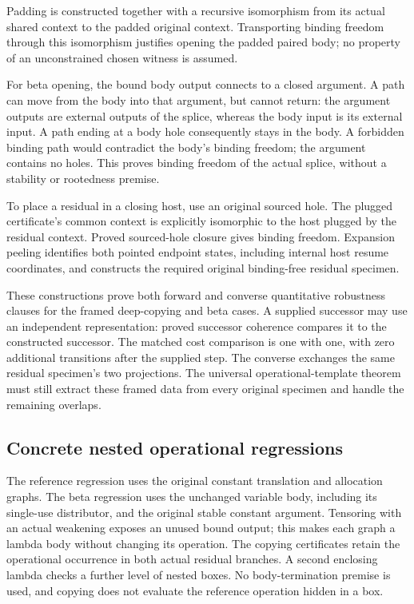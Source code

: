 Padding is constructed together with a recursive isomorphism from its
actual shared context to the padded original context. Transporting binding
freedom through this isomorphism justifies opening the padded paired body;
no property of an unconstrained chosen witness is assumed.

For beta opening, the bound body output connects to a closed argument.
A path can move from the body into that argument, but cannot return: the
argument outputs are external outputs of the splice, whereas the body
input is its external input. A path ending at a body hole consequently
stays in the body. A forbidden binding path would contradict the body's
binding freedom; the argument contains no holes. This proves binding
freedom of the actual splice, without a stability or rootedness premise.

To place a residual in a closing host, use an original sourced hole.
The plugged certificate's common context is explicitly isomorphic to the
host plugged by the residual context. Proved sourced-hole closure gives
binding freedom. Expansion peeling identifies both pointed endpoint
states, including internal host resume coordinates, and constructs the
required original binding-free residual specimen.

These constructions prove both forward and converse quantitative robustness
clauses for the framed deep-copying and beta cases. A supplied successor
may use an independent representation: proved successor coherence compares
it to the constructed successor. The matched cost comparison is one with
one, with zero additional transitions after the supplied step. The converse
exchanges the same residual specimen's two projections. The universal
operational-template theorem must still extract these framed data from
every original specimen and handle the remaining overlaps.

\subsection{Concrete nested operational regressions}
The reference regression uses the original constant translation and
allocation graphs. The beta regression uses the unchanged variable body,
including its single-use distributor, and the original stable constant
argument. Tensoring with an actual weakening exposes an unused bound output;
this makes each graph a lambda body without changing its operation.
The copying certificates retain the operational occurrence in both actual
residual branches. A second enclosing lambda checks a further level of
nested boxes. No body-termination premise is used, and copying does not
evaluate the reference operation hidden in a box.

